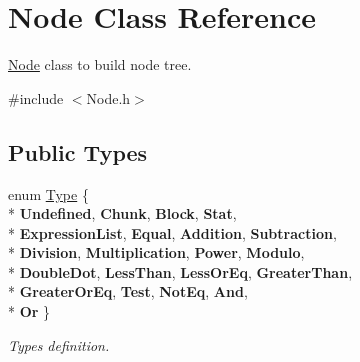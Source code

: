 \hypertarget{classNode}{}\section{Node Class Reference}
\label{classNode}


\hyperlink{classNode}{Node} class to build node tree.  




{\ttfamily \#include $<$Node.\+h$>$}

\subsection*{Public Types}
\begin{DoxyCompactItemize}
\item 
\hypertarget{classNode_a8dad370be1595f49e0a7c2406a91e867}{}enum \hyperlink{classNode_a8dad370be1595f49e0a7c2406a91e867}{Type} \{ \\*
{\bfseries Undefined}, 
{\bfseries Chunk}, 
{\bfseries Block}, 
{\bfseries Stat}, 
\\*
{\bfseries Expression\+List}, 
{\bfseries Equal}, 
{\bfseries Addition}, 
{\bfseries Subtraction}, 
\\*
{\bfseries Division}, 
{\bfseries Multiplication}, 
{\bfseries Power}, 
{\bfseries Modulo}, 
\\*
{\bfseries Double\+Dot}, 
{\bfseries Less\+Than}, 
{\bfseries Less\+Or\+Eq}, 
{\bfseries Greater\+Than}, 
\\*
{\bfseries Greater\+Or\+Eq}, 
{\bfseries Test}, 
{\bfseries Not\+Eq}, 
{\bfseries And}, 
\\*
{\bfseries Or}
 \}\label{classNode_a8dad370be1595f49e0a7c2406a91e867}

\begin{DoxyCompactList}\small\item\em Types definition. \end{DoxyCompactList}\end{DoxyCompactItemize}
